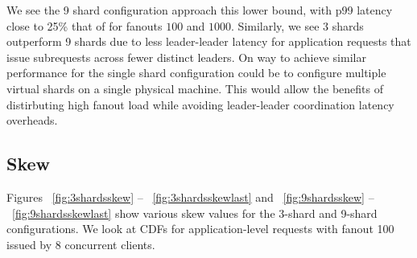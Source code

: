 We see the 9 shard configuration approach this lower bound, with p99 latency close to 25\% that of \mpaxos for fanouts $100$ and $1000$. Similarly, we see 3 shards outperform 9 shards due to less leader-leader latency for application requests that issue subrequests across fewer distinct leaders. On way to achieve similar performance for the single shard configuration could be to configure multiple virtual shards on a single physical machine. This would allow the benefits of distirbuting high fanout load while avoiding leader-leader coordination latency overheads.

\subsection{Skew}
Figures ~\ref{fig:3shardsskew} -- ~\ref{fig:3shardsskewlast} and ~\ref{fig:9shardsskew} -- ~\ref{fig:9shardsskewlast} show various skew values for the 3-shard and 9-shard configurations. We look at CDFs for application-level requests with fanout 100 issued by 8 concurrent clients. 

